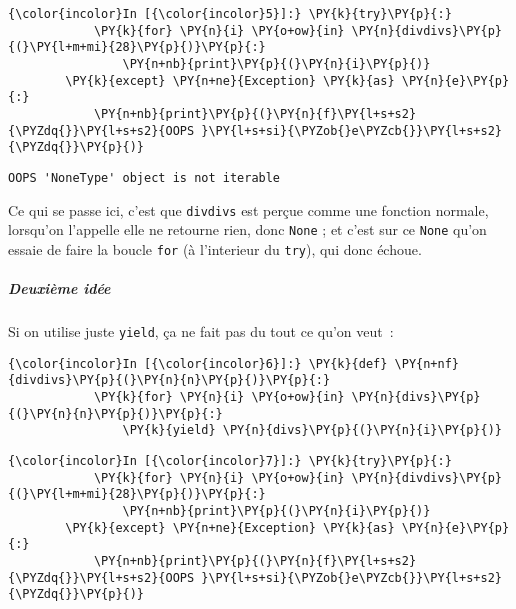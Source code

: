     \begin{Verbatim}[commandchars=\\\{\}]
{\color{incolor}In [{\color{incolor}5}]:} \PY{k}{try}\PY{p}{:}
            \PY{k}{for} \PY{n}{i} \PY{o+ow}{in} \PY{n}{divdivs}\PY{p}{(}\PY{l+m+mi}{28}\PY{p}{)}\PY{p}{:}
                \PY{n+nb}{print}\PY{p}{(}\PY{n}{i}\PY{p}{)}
        \PY{k}{except} \PY{n+ne}{Exception} \PY{k}{as} \PY{n}{e}\PY{p}{:}
            \PY{n+nb}{print}\PY{p}{(}\PY{n}{f}\PY{l+s+s2}{\PYZdq{}}\PY{l+s+s2}{OOPS }\PY{l+s+si}{\PYZob{}e\PYZcb{}}\PY{l+s+s2}{\PYZdq{}}\PY{p}{)}
\end{Verbatim}


    \begin{Verbatim}[commandchars=\\\{\}]
OOPS 'NoneType' object is not iterable

    \end{Verbatim}

    Ce qui se passe ici, c'est que \texttt{divdivs} est perçue comme une
fonction normale, lorsqu'on l'appelle elle ne retourne rien, donc
\texttt{None} ; et c'est sur ce \texttt{None} qu'on essaie de faire la
boucle \texttt{for} (à l'interieur du \texttt{try}), qui donc échoue.

    \hypertarget{deuxiuxe8me-iduxe9e}{%
\subparagraph{Deuxième idée}\label{deuxiuxe8me-iduxe9e}}

    Si on utilise juste \texttt{yield}, ça ne fait pas du tout ce qu'on
veut~:

    \begin{Verbatim}[commandchars=\\\{\}]
{\color{incolor}In [{\color{incolor}6}]:} \PY{k}{def} \PY{n+nf}{divdivs}\PY{p}{(}\PY{n}{n}\PY{p}{)}\PY{p}{:}
            \PY{k}{for} \PY{n}{i} \PY{o+ow}{in} \PY{n}{divs}\PY{p}{(}\PY{n}{n}\PY{p}{)}\PY{p}{:}
                \PY{k}{yield} \PY{n}{divs}\PY{p}{(}\PY{n}{i}\PY{p}{)}
\end{Verbatim}


    \begin{Verbatim}[commandchars=\\\{\}]
{\color{incolor}In [{\color{incolor}7}]:} \PY{k}{try}\PY{p}{:}
            \PY{k}{for} \PY{n}{i} \PY{o+ow}{in} \PY{n}{divdivs}\PY{p}{(}\PY{l+m+mi}{28}\PY{p}{)}\PY{p}{:}
                \PY{n+nb}{print}\PY{p}{(}\PY{n}{i}\PY{p}{)}
        \PY{k}{except} \PY{n+ne}{Exception} \PY{k}{as} \PY{n}{e}\PY{p}{:}
            \PY{n+nb}{print}\PY{p}{(}\PY{n}{f}\PY{l+s+s2}{\PYZdq{}}\PY{l+s+s2}{OOPS }\PY{l+s+si}{\PYZob{}e\PYZcb{}}\PY{l+s+s2}{\PYZdq{}}\PY{p}{)}
\end{Verbatim}


